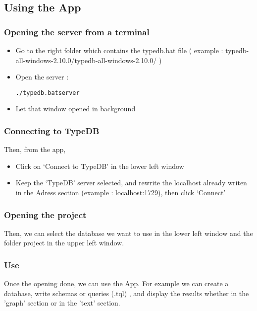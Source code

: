 \documentclass[runningheads]{llncs}
\begin{document}
\subsection{Using the App}

\subsubsection{Opening the server from a terminal}
\begin{itemize}
\item Go to the right folder which contains the typedb.bat file ( example : typedb-all-windows-2.10.0/typedb-all-windows-2.10.0/ )
\item Open the server : \begin{alltt}./typedb.bat server \end{alltt}
\item Let that window opened in background
\end{itemize}

\subsubsection{Connecting to TypeDB}
Then, from the app,
\begin{itemize}
\item Click on ‘Connect to TypeDB’ in the lower left window
\item Keep the ‘TypeDB’ server selected, and rewrite the localhost already writen in the Adress section (example : localhost:1729), then click ‘Connect’
\end{itemize}

\subsubsection{Opening the project}
Then, we can select the database we want to use in the lower left window and the folder project in the upper left window.

\subsubsection{Use}
    Once the opening done, we can use the App. For example we can create a database, write schemas or queries (.tql) , and display the results whether in the 'graph' section or in the 'text' section.
    
\end{document}
